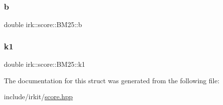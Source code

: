 \subsubsection{\texorpdfstring{b}{b}}
{\footnotesize\ttfamily double irk\+::score\+::\+B\+M25\+::b}

\mbox{\label{structirk_1_1score_1_1BM25_a29a294777cb1b8034abd2b37f70a1d0a}} 
\subsubsection{\texorpdfstring{k1}{k1}}
{\footnotesize\ttfamily double irk\+::score\+::\+B\+M25\+::k1}



The documentation for this struct was generated from the following file\+:\begin{DoxyCompactItemize}
\item 
include/irkit/\mbox{\hyperlink{score_8hpp}{score.\+hpp}}\end{DoxyCompactItemize}
